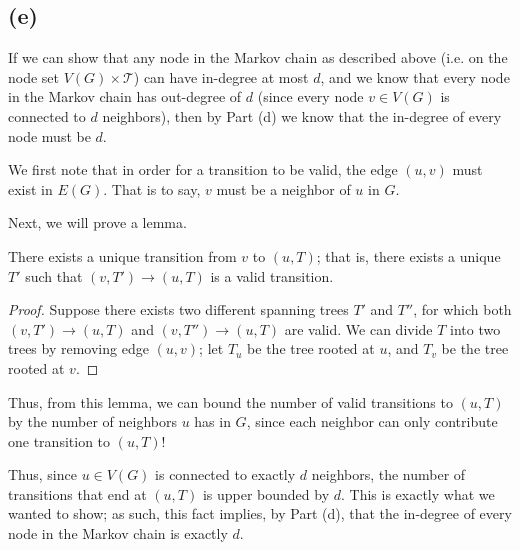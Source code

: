 \documentclass{6046}
\begin{document}
\subsection*{(e)}
If we can show that any node in the Markov chain as described above
(i.e. on the node set $V(G) \times \mathcal{T}$) can have
in-degree at most $d$, and we know that every node in the Markov
chain has out-degree of $d$ (since every node $v \in V(G)$
is connected to $d$ neighbors), then by Part (d) we know
that the in-degree of every node must be $d$.

We first note that in order for a transition to be valid,
the edge $(u, v)$ must exist in $E(G)$. That is to say,
$v$ must be a neighbor of $u$ in $G$.

Next, we will prove a lemma.
\vspace{-1em}
\begin{lemma}
    There exists a unique transition from $v$ to $(u, T)$;
    that is, there exists a unique $T'$ such that
    $(v, T') \rightarrow (u, T)$ is a valid transition.
\end{lemma}

\begin{proof}
Suppose there exists two different spanning trees $T'$ and $T''$,
for which both $(v, T') \rightarrow (u, T)$ and
$(v, T'') \rightarrow (u, T)$ are valid. We can divide
$T$ into two trees by removing edge $(u, v)$; let $T_u$
be the tree rooted at $u$, and $T_v$ be the tree
rooted at $v$.
\end{proof}

Thus, from this lemma, we can bound the number of valid
transitions to $(u, T)$ by the number of neighbors $u$
has in $G$, since each neighbor can only contribute one
transition to $(u, T)$!

Thus, since $u \in V(G)$ is connected to exactly
$d$ neighbors, the number of transitions that
end at $(u, T)$ is upper bounded by $d$. This is
exactly what we wanted to show; as such, this fact implies,
by Part (d), that the in-degree of every node in the
Markov chain is exactly $d$.
\end{document}
